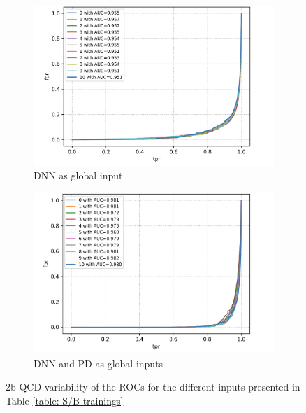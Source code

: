 \begin{figure}[hbt]
\centering
\begin{subfigure}{.5\textwidth}
  \centering
  \includegraphics[width=1.1\linewidth]{Images/7.S_B/Variability/2b QCD DNN.png}
  \caption{DNN as global input}
  \label{fig: 2b QCD DNN}
\end{subfigure}%
\begin{subfigure}{.5\textwidth}
  \centering
  \includegraphics[width=1.1\linewidth]{Images/7.S_B/Variability/2b QCD DNN and prob diff.png}
  \caption{DNN and PD as global inputs}
  \label{fig: 2b QCD DNN PD}
\end{subfigure}
\caption{2b-QCD variability of the ROCs for the different inputs presented in Table \ref{table: S/B trainings}}
\label{fig: 2b QCD v ariability}
\end{figure}

